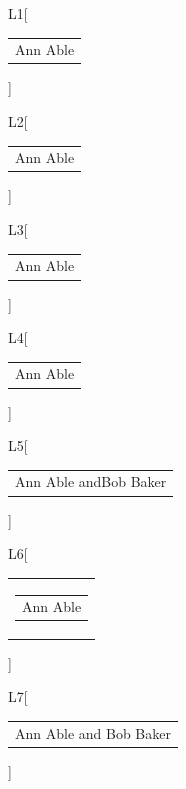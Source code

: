 \documentclass{article}
\makeatletter
\providecommand\lx@fm@separators[1]{\begin{tabular}[t]{c}#1\end{tabular}}
\newcommand\sep[1]{[\lx@fm@separators{#1}]}
\providecommand\And{\and}
\providecommand\AND{\and}
\newcommand\aut{Ann Able \and Bob Baker}
\let\nx\and
\makeatother
\begin{document}
L1\sep{Ann Able \and Bob Baker}

L2\sep{Ann Able \And Bob Baker \AND Cy Coe}

L3\sep{\aut}

L4\sep{Ann Able \nx Bob Baker}

L5\sep{Ann Able \csname and\endcsname Bob Baker}

L6\sep{\parbox[t]{5cm}{\begin{tabular}[t]{c}Ann Able \and Bob Baker\end{tabular}}}

L7\sep{Ann Able and Bob Baker}
\end{document}
